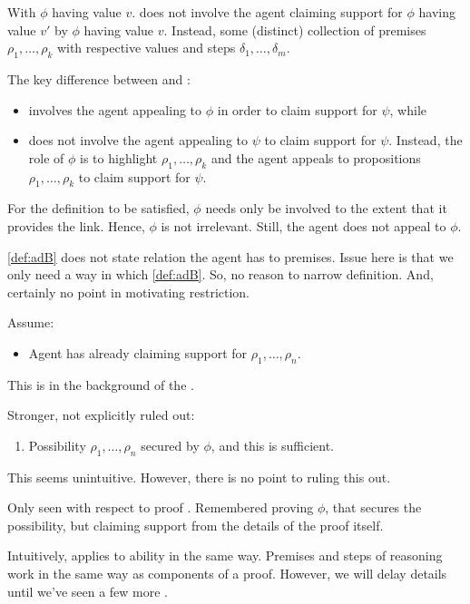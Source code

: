 \begin{note}
  With \adA{} \(\phi\) having value \(v\).
  \adB{} does not involve the agent claiming support for \(\phi\) having value \(v'\) by \(\phi\) having value \(v\).
  Instead, some (distinct) collection of premises \(\rho_{1},\dots,\rho_{k}\) with respective values and steps \(\delta_{1},\dots,\delta_{m}\).

  The key difference between \adA{} and \adB{}:
  \begin{itemize}
  \item \adA{} involves the agent appealing to \(\phi\) in order to claim support for \(\psi\), while
  \item \adB{} does not involve the agent appealing to \(\psi\) to claim support for \(\psi\).
    Instead, the role of \(\phi\) is to highlight \(\rho_{1},\dots,\rho_{k}\) and the agent appeals to propositions \(\rho_{1},\dots,\rho_{k}\) to claim support for \(\psi\).
  \end{itemize}

  For the definition to be satisfied, \(\phi\) needs only be involved to the extent that it provides the link.
  Hence, \(\phi\) is not irrelevant.
  Still, the agent does not appeal to \(\phi\).
\end{note}

\begin{note}
  \autoref{def:adB} does not state relation the agent has to premises.
  Issue here is that we only need a way in which \autoref{def:adB}.
  So, no reason to narrow definition.
  And, certainly no point in motivating restriction.

  Assume:
  \begin{itemize}
  \item Agent has already claiming support for \(\rho_{1},\dots,\rho_{n}\).
  \end{itemize}

  This is in the background of the .

  Stronger, not explicitly ruled out:

  \begin{enumerate}
  \item Possibility \(\rho_{1},\dots,\rho_{n}\) secured by \(\phi\), and this is sufficient.
  \end{enumerate}

  This seems unintuitive.
  However, there is no point to ruling this out.
\end{note}

\begin{note}
  Only seen \adB{} with respect to proof .
  Remembered proving \(\phi\), that secures the possibility, but claiming support from the details of the proof itself.

  Intuitively, applies to ability in the same way.
  Premises and steps of reasoning work in the same way as components of a proof.
  However, we will delay details until we've seen a few more .
\end{note}

